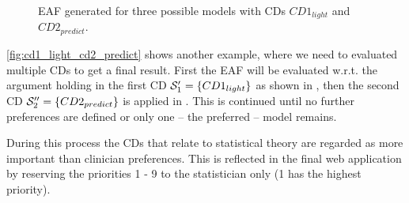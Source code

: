 \begin{figure}[hbtp]
	\hfill
	\caption{\gls{EAF} generated for three possible models with \glspl{CD} $CD1_{light}$ and $CD2_{predict}$.}
	\label{fig:cd1_light_cd2_predict}
\end{figure}



\autoref{fig:cd1_light_cd2_predict} shows another example, where we need to evaluated multiple \glspl{CD} to get a final result. First the \gls{EAF} will be evaluated w.r.t. the argument holding in the first \gls{CD} $\S_1' = \{CD1_{light}\}$ as shown in , then the second \gls{CD} $\S_2'' = \{CD2_{predict}\}$ is applied in . This is continued until no further preferences are defined or only one -- the preferred -- model remains.

During this process the \glspl{CD} that relate to statistical theory are regarded as more important than clinician preferences. This is reflected in the final web application by reserving the priorities 1 - 9 to the statistician only (1 has the highest priority).

